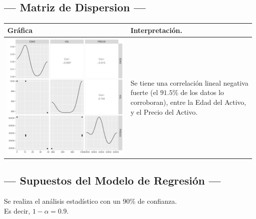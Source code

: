 \subsection{\centering --- Matriz de Dispersion ---} %
\begin{center}
  \begin{tabular}{|p{11cm}|p{5cm}|}
    \hline
    Gráfica & Interpretación. \\ \hline 
    \begin{minipage}{\textwidth}
    \includegraphics[width= 0.5 \linewidth, page=1]{../0.documentos/3_MERGED_MARKET/1_TANQUE/r/Rplots.pdf}
    \end{minipage} 
    &
		Se tiene una correlación lineal negativa fuerte (el \(91.5\%\) de los datos lo corroboran),
		entre la Edad del Activo, y el Precio del Activo.
		\\ \hline 
  \end{tabular}
\end{center} 

\subsection{\centering --- Supuestos del Modelo de Regresión ---} %

Se realiza el análisis estadístico con un \(90\%\) de confianza. \\ 
Es decir, \(1- \alpha = 0.9\).

